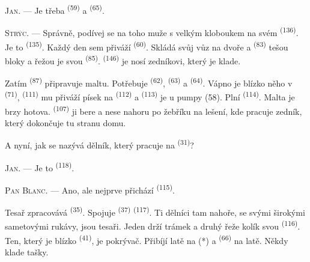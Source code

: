 \textsc{Jan}. --- Je třeba  \textsuperscript{(59)} a 
\textsuperscript{(65)}.

\textsc{Strýc}. --- Správně, podívej se na toho muže s velkým kloboukem na svém
 \textsuperscript{(136)}. Je to  \textsuperscript{(135)}.
Každý den sem přiváží  \textsuperscript{(60)}. Skládá svůj vůz na
dvoře a  \textsuperscript{(83)} tešou bloky a řežou je svou
 \textsuperscript{(85)}. 
\textsuperscript{(146)} je nosí zedníkovi, který je klade.

Zatím  \textsuperscript{(87)} připravuje maltu. Potřebuje 
\textsuperscript{(62)},  \textsuperscript{(63)} a 
\textsuperscript{(64)}. Vápno je blízko něho v  \textsuperscript{(71)},
 \textsuperscript{(111)} mu přiváží písek na
 \textsuperscript{(112)} a  \textsuperscript{(113)} je
u pumpy (58). Plní  \textsuperscript{(114)}. Malta je brzy hotova.
 \textsuperscript{(107)} ji bere a nese nahoru po žebříku na
lešení, kde pracuje zedník, který dokončuje tu stranu domu.

A nyní, jak se nazývá dělník, který pracuje na 
\textsuperscript{(31)}?

\textsc{Jan}. --- Je to  \textsuperscript{(118)}.

\VUsaut{3.0mm}
\VUsaut{3.0mm}

\textsc{Pan Blanc}. --- Ano, ale nejprve přichází 
\textsuperscript{(115)}.

Tesař zpracovává  \textsuperscript{(35)}. Spojuje 
\textsuperscript{(37)}  \textsuperscript{(117)}. Ti dělníci tam nahoře,
se svými širokými sametovými rukávy, jsou tesaři. Jeden drží trámek a druhý řeže kolík
svou  \textsuperscript{(116)}. Ten, který je blízko 
\textsuperscript{(41)}, je pokrývač. Přibíjí latě na (*)  a
 \textsuperscript{(66)} na latě. Někdy klade tašky.


